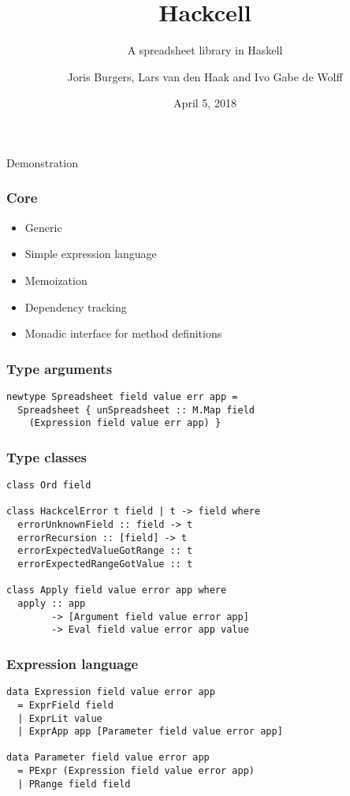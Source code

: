 \documentclass{beamer}
\title{Hackcell}
\subtitle{A spreadsheet library in Haskell}
\author{Joris Burgers, Lars van den Haak and Ivo Gabe de Wolff}
\date{April 5, 2018}
\begin{document}
	\frame{\titlepage}
  \begin{frame}
	\begin{center}
		\huge{Demonstration}
	\end{center}
  \end{frame}

\begin{frame}
\frametitle{Core}
\begin{itemize}
	\item Generic
	\item Simple expression language
	\item Memoization
	\item Dependency tracking
	\item Monadic interface for method definitions
\end{itemize}
\end{frame}

\begin{frame}[fragile]
\frametitle{Type arguments}
\begin{verbatim}
newtype Spreadsheet field value err app =
  Spreadsheet { unSpreadsheet :: M.Map field
    (Expression field value err app) }
\end{verbatim}
\end{frame}

\begin{frame}[fragile]
\frametitle{Type classes}
\begin{verbatim}
class Ord field

class HackcelError t field | t -> field where
  errorUnknownField :: field -> t
  errorRecursion :: [field] -> t
  errorExpectedValueGotRange :: t
  errorExpectedRangeGotValue :: t

class Apply field value error app where
  apply :: app
        -> [Argument field value error app]
        -> Eval field value error app value

\end{verbatim}
\end{frame}

\begin{frame}[fragile]
\frametitle{Expression language}
\begin{verbatim}
data Expression field value error app
  = ExprField field
  | ExprLit value
  | ExprApp app [Parameter field value error app]

data Parameter field value error app
  = PExpr (Expression field value error app)
  | PRange field field
\end{verbatim}
\end{frame}
\end{document}
